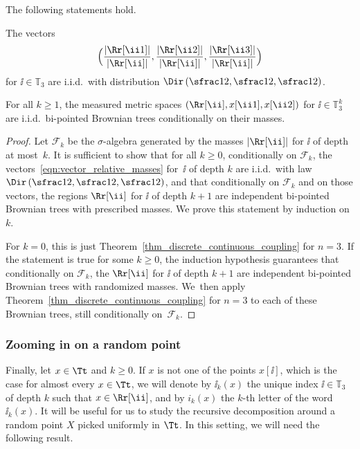 \begin{proposition}\label{prop_independence_decomposition}
The following statements hold.
\begin{enumeratei}
\item The vectors\vspace*{-3pt}
\begin{equation}\label{eqn:vector_relative_masses}
\Bigl( \frac{\left| \Rr[\ii 1] \right|}{\left| \Rr[\ii ] \right|}, \frac{\left| \Rr[\ii 2] \right|}{\left| \Rr[\ii ] \right|}, \frac{\left| \Rr[\ii 3] \right|}{\left| \Rr[\ii ] \right|} \Bigr)
\end{equation}
for $\ii \in \mathbb{T}_3$ are i.i.d.\ with distribution $\Dir \left( \sfrac12, \sfrac12, \sfrac12 \right)$.
\item For all $k \geq 1$, the measured metric spaces $\left( \Rr[\ii ], x[\ii 1], x[\ii 2] \right)$ for $\ii \in \mathbb{T}_3^k$ are i.i.d.\ bi-pointed Brownian trees conditionally on their masses.
\end{enumeratei}
\end{proposition}

\begin{proof}
Let $\mathcal{F}_k$ be the $\sigma$-algebra generated by the masses $\left| \Rr[\ii ] \right|$ for $\ii$ of depth at most~$k$.
It is sufficient to show that for all $k \geq 0$, conditionally on $\mathcal{F}_k$, the vectors~\eqref{eqn:vector_relative_masses} for~$\ii $ of depth $k$ are i.i.d.\ with law $\Dir \left( \sfrac12, \sfrac12, \sfrac12 \right)$, and that conditionally on $\mathcal{F}_k$ and on those vectors, the regions $\Rr[\ii ]$ for $\ii $ of depth $k+1$ are independent bi-pointed Brownian trees with prescribed masses.
We prove this statement by induction on $k$.

For $k=0$, this is just Theorem~\ref{thm_discrete_continuous_coupling} for $n=3$. If the statement is true for some $k \geq 0$, the induction hypothesis guarantees that conditionally on $\mathcal{F}_k$, the $\Rr[\ii ]$ for $\ii $ of depth $k+1$ are independent bi-pointed Brownian trees with randomized masses. We~then apply Theorem~\ref{thm_discrete_continuous_coupling} for $n=3$ to each of these Brownian trees, still conditionally on~$\mathcal{F}_k$.
\end{proof}

\subsubsection*{Zooming in on a random point}
Finally, let $x \in \Tt$ and $k \geq 0$.
If $x$ is not one of the points $x[\ii]$, which is the case for almost every $x \in \Tt$, we will denote by $\ii_k(x)$ the unique index $\ii \in \mathbb{T}_3$ of depth $k$ such that $x \in \Rr[\ii ]$, and by $i_k(x)$ the $k$-th letter of the word $\ii _k(x)$.
It will be useful for us to study the recursive decomposition around a random point $X$ picked uniformly in $\Tt$.
In this setting, we will need the following result.

